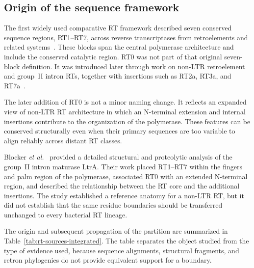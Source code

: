 \subsection{Origin of the sequence framework}

The first widely used comparative RT framework described seven conserved
sequence regions, RT1--RT7, across reverse transcriptases from retroelements
and related systems~\cite{xiong1990}. These blocks span the central polymerase
architecture and include the conserved catalytic region. RT0 was not part of
that original seven-block definition. It was introduced later through work on
non-LTR retroelement and group~II intron RTs, together with insertions such as
RT2a, RT3a, and RT7a~\cite{malik1999,zimmerly2001}.

The later addition of RT0 is not a minor naming change. It reflects an
expanded view of non-LTR RT architecture in which an N-terminal extension and
internal insertions contribute to the organization of the polymerase. These
features can be conserved structurally even when their primary sequences are
too variable to align reliably across distant RT classes.

Blocker \textit{et al.}~\cite{blocker2005} provided a detailed structural and
proteolytic analysis of the group~II intron maturase LtrA. Their work placed
RT1--RT7 within the fingers and palm region of the polymerase, associated RT0
with an extended N-terminal region, and described the relationship between the
RT core and the additional insertions. The study established a reference
anatomy for a non-LTR RT, but it did not establish that the same residue
boundaries should be transferred unchanged to every bacterial RT lineage.

The origin and subsequent propagation of the partition are summarized in
Table~\ref{tab:rt-sources-integrated}. The table separates the object studied
from the type of evidence used, because sequence alignments, structural
fragments, and retron phylogenies do not provide equivalent support for a
boundary.

